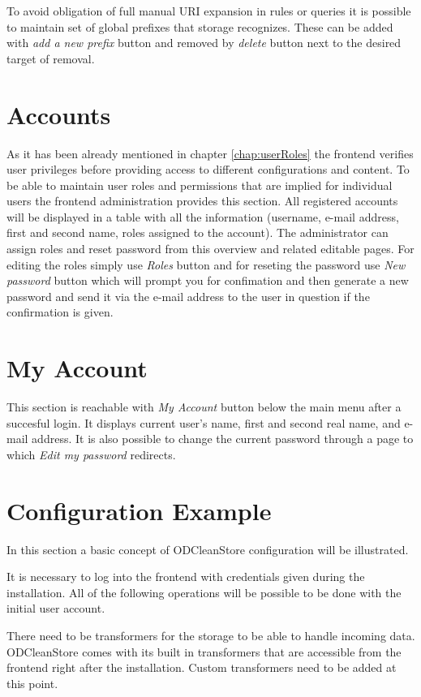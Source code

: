 To avoid obligation of full manual URI expansion in  rules or queries it is possible to maintain set of global  prefixes that storage recognizes. These can be added with \emph{add a new prefix} button and removed by \emph{delete} button next to the desired target of removal.

\section{Accounts}

As it has been already mentioned in chapter \ref{chap:userRoles} the frontend verifies user privileges before providing access to different configurations and content. To be able to maintain user roles and permissions that are implied for individual users the frontend administration provides this section. All registered accounts will be displayed in a table with all the information (username, e-mail address, first and second name, roles assigned to the account). The administrator can assign roles and reset password from this overview and related editable pages. For editing the roles simply use \emph{Roles} button and for reseting the password use \emph{New password} button which will prompt you for confimation and then generate a new password and send it via the e-mail address to the user in question if the confirmation is given.

\section{My Account}

This section is reachable with \emph{My Account} button below the main menu after a succesful login. It displays current user's name, first and second real name, and e-mail address. It is also possible to change the current password through a page to which \emph{Edit my password} redirects.

\section{Configuration Example}

In this section a basic concept of ODCleanStore configuration will be illustrated.

It is necessary to log into the frontend with credentials given during the installation. All of the following operations will be possible to be done with the initial user account.

There need to be transformers for the storage to be able to handle incoming data. ODCleanStore comes with its built in transformers that are accessible from the frontend right after the installation. Custom transformers need to be added at this point.

